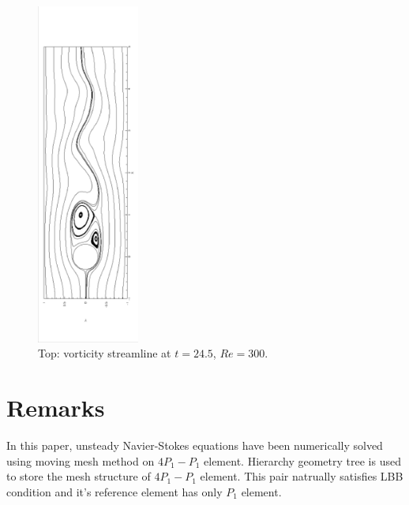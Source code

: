 \documentclass[mathpazo]{aamm}
\begin{document}
      \begin{figure}[!htbp]
       \begin{center}
         \includegraphics[width = 0.3\textwidth, angle = -90]{picture/obstacle_flow_data/streamline_t_24_5s.eps}
       \end{center}  
       \caption{\small Top: vorticity streamline at $t = 24.5$, $Re = 300$.}
       \label{fig::cylinder_streamline_t24_5s}
     \end{figure}


\section{Remarks}
   \label{sec8} In this paper, unsteady Navier-Stokes equations have
   been numerically solved using moving mesh method on $4P_1-P_1$
   element. Hierarchy geometry tree is used to  store the
   mesh structure of $4P_1-P_1$ element. This pair natrually satisfies 
   LBB condition and it's reference element has only $P_1$ element.
   
\end{document}
